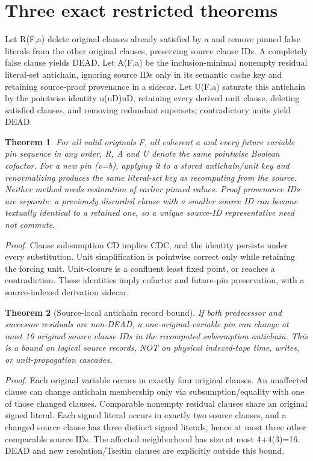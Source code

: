\documentclass[11pt]{article}
\newtheorem{theorem}{Theorem}
\begin{document}
\section*{Three exact restricted theorems}
Let R(F,a) delete original clauses already satisfied by a and remove pinned false literals from the other original clauses, preserving source clause IDs. A completely false clause yields DEAD. Let A(F,a) be the inclusion-minimal nonempty residual literal-set antichain, ignoring source IDs only in its semantic cache key and retaining source-proof provenance in a sidecar. Let U(F,a) saturate this antichain by the pointwise identity u\wedge(\neg u\vee D)\equiv u\wedge D, retaining every derived unit clause, deleting satisfied clauses, and removing redundant supersets; contradictory units yield DEAD.
\begin{theorem}
For all valid originals F, all coherent a and every future variable pin sequence in any order, R, A and U denote the same pointwise Boolean cofactor. For a new pin (v=b), applying it to a stored antichain/unit key and renormalizing produces the same literal-set key as recomputing from the source. Neither method needs restoration of earlier pinned values. Proof provenance IDs are separate: a previously discarded clause with a smaller source ID can become textually identical to a retained one, so a unique source-ID representative need not commute.
\end{theorem}
\noindent\emph{Proof.} Clause subsumption C\subseteq D implies C\wedge D\equiv C, and the identity persists under every substitution. Unit simplification is pointwise correct only while retaining the forcing unit. Unit-closure is a confluent least fixed point, or reaches a contradiction. These identities imply cofactor and future-pin preservation, with a source-indexed derivation sidecar.
\begin{theorem}[Source-local antichain record bound]
If both predecessor and successor residuals are non-DEAD, a one-original-variable pin can change at most 16 original source clause IDs in the recomputed subsumption antichain. This is a bound on logical source records, NOT on physical indexed-tape time, writes, or unit-propagation cascades.
\end{theorem}
\noindent\emph{Proof.} Each original variable occurs in exactly four original clauses. An unaffected clause can change antichain membership only via subsumption/equality with one of those changed clauses. Comparable nonempty residual clauses share an original signed literal. Each signed literal occurs in exactly two source clauses, and a changed source clause has three distinct signed literals, hence at most three other comparable source IDs. The affected neighborhood has size at most 4+4(3)=16. DEAD and new resolution/Tseitin clauses are explicitly outside this bound.
\end{document}
